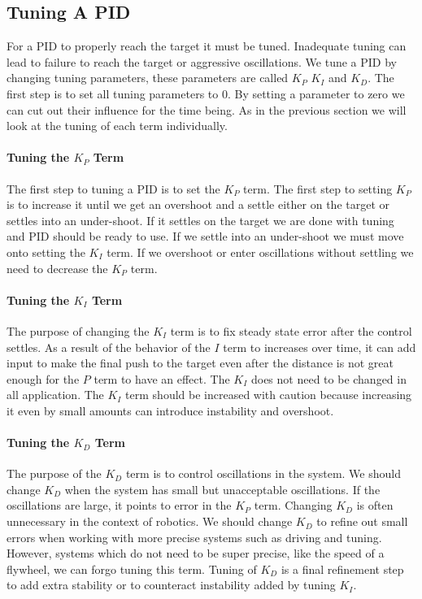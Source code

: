 \documentclass[12pt]{report}
\begin{document}
\subsection{Tuning A PID}
    For a PID to properly reach the target it must be tuned.
    Inadequate tuning can lead to failure to reach the target or aggressive oscillations.
    We tune a PID by changing tuning parameters, these parameters are called $K_P$ $K_I$ and $K_D$. 
    The first step is to set all tuning parameters to 0.
    By setting a parameter to zero we can cut out their influence for the time being. 
    As in the previous section we will look at the tuning of each term individually.

\paragraph{Tuning the $K_P$ Term}
    The first step to tuning a PID is to set the $K_P$ term.
    The first step to setting $K_P$ is to increase it until we get an overshoot and a settle either on the target or settles into an under-shoot. 
    If it settles on the target we are done with tuning and PID should be ready to use.
    If we settle into an under-shoot we must move onto setting the $K_I$ term.
    If we overshoot or enter oscillations without settling we need to decrease the $K_P$ term.

\paragraph{Tuning the $K_I$ Term}
    The purpose of changing the $K_I$ term is to fix steady state error after the control settles.
    As a result of the behavior of the $I$ term to increases over time, 
        it can add input to make the final push to the target even after the distance is not great enough for the $P$ term to have an effect. 
    The $K_I$ does not need to be changed in all application.
    The $K_I$ term should be increased with caution because increasing it even by small amounts can introduce instability and overshoot.

\paragraph{Tuning the $K_D$ Term}
    The purpose of the $K_D$ term is to control oscillations in the system. We should change $K_D$ when the system has small but unacceptable oscillations. 
    If the oscillations are large, 
        it points to error in the $K_P$ term.
    Changing $K_D$ is often unnecessary in the context of robotics. We should change $K_D$ to refine out small errors when working with more precise systems such as driving and tuning.
    However, systems which do not need to be super precise, like the speed of a flywheel, we can forgo tuning this term. 
    Tuning of $K_D$ is a final refinement step to add extra stability or to counteract instability added by tuning $K_I$.
\end{document}
